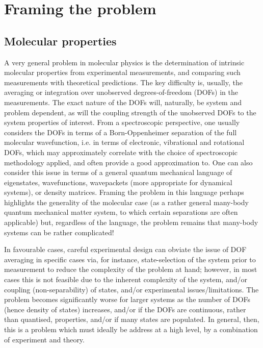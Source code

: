 \section{Framing the problem}

\subsection{Molecular properties}
A very general problem in molecular physics is the determination of intrinsic molecular properties from experimental measurements, and comparing such measurements with theoretical predictions. The key difficulty is, usually, the averaging or integration over unobserved degrees-of-freedom (DOFs) in the measurements. The exact nature of the DOFs will, naturally, be system and problem dependent, as will the coupling strength of the unobserved DOFs to the system properties of interest. From a spectroscopic perspective, one usually considers the DOFs in terms of a Born-Oppenheimer separation of the full molecular wavefunction, i.e. in terms of electronic, vibrational and rotational DOFs, which may approximately correlate with the choice of spectroscopic methodology applied, and often provide a good approximation to. One can also consider this issue in terms of a general quantum mechanical language of eigenstates, wavefunctions, wavepackets (more appropriate for dynamical systems), or density matrices. Framing the problem in this language perhaps highlights the generality of the molecular case (as a rather general many-body quantum mechanical matter system, to which certain separations are often applicable) but, regardless of the language, the problem remains that many-body systems can be rather complicated!

In favourable cases, careful experimental design can obviate the issue of DOF averaging in specific cases via, for instance, state-selection of the system prior to measurement to reduce the complexity of the problem at hand; however, in most cases this is not feasible due to the inherent complexity of the system, and/or coupling (non-separability) of states, and/or experimental issues/limitations. The problem becomes significantly worse for larger systems as the number of DOFs (hence density of states) increases, and/or if the DOFs are continuous, rather than quantised, properties, and/or if many states are populated. In general, then, this is a problem which must ideally be address at a high level, by a combination of experiment and theory.